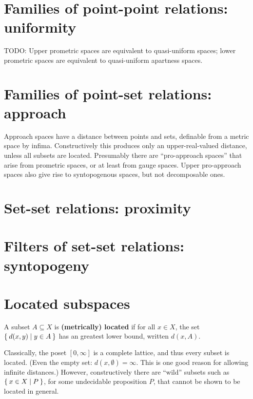 \documentclass{article}
\def\Rp{[0,\infty]}
\begin{document}
\section{Families of point-point relations: uniformity}
\label{sec:uniformity}


TODO: Upper prometric spaces are equivalent to quasi-uniform spaces; lower prometric spaces are equivalent to quasi-uniform apartness spaces.


\section{Families of point-set relations: approach}
\label{sec:approach}

Approach spaces have a distance between points and sets, definable from a metric space by infima.
Constructively this produces only an upper-real-valued distance, unless all subsets are located.
Presumably there are ``pro-approach spaces'' that arise from prometric spaces, or at least from gauge spaces.
Upper pro-approach spaces also give rise to syntopogenous spaces, but not decomposable ones.


\section{Set-set relations: proximity}
\label{sec:set-set}
\label{sec:proximity}



\section{Filters of set-set relations: syntopogeny}
\label{sec:syntop}



\section{Located subspaces}
\label{sec:located}

\begin{defn}
  A subset $A\subseteq X$ is \textbf{(metrically) located} if for all $x\in X$, the set $\Set{ d(x,y) | y\in A }$ has an greatest lower bound, written $d(x,A)$.
\end{defn}

Classically, the poset $\Rp$ is a complete lattice, and thus every subset is located.
(Even the empty set: $d(x,\emptyset)=\infty$.
This is one good reason for allowing infinite distances.)
However, constructively there are ``wild'' subsets such as $\Set{x\in X | P}$, for some undecidable proposition $P$, that cannot be shown to be located in general.




\end{document}
